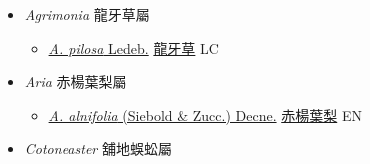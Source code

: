 
  \begin{itemize}
 \item[] \textit{Agrimonia} 龍牙草屬
                    
  \begin{itemize}
        \item[] \href{http://www.theplantlist.org/tpl1.1/search?q=Agrimonia+pilosa}{\textit{A. pilosa} Ledeb.}   \href{\detokenize{http://taibnet.sinica.edu.tw/chi/taibnet_species_list.php?T2=龍牙草&T2_new_value=true&fr=y}}{龍牙草} LC
  \end{itemize}
 \item[] \textit{Aria} 赤楊葉梨屬
                    
  \begin{itemize}
        \item[] \href{http://www.theplantlist.org/tpl1.1/search?q=Aria+alnifolia}{\textit{A. alnifolia} (Siebold \& Zucc.) Decne.}   \href{\detokenize{http://taibnet.sinica.edu.tw/chi/taibnet_species_list.php?T2=赤楊葉梨&T2_new_value=true&fr=y}}{赤楊葉梨} EN
  \end{itemize}
 \item[] \textit{Cotoneaster} 舖地蜈蚣屬
                    

\end{itemize}
